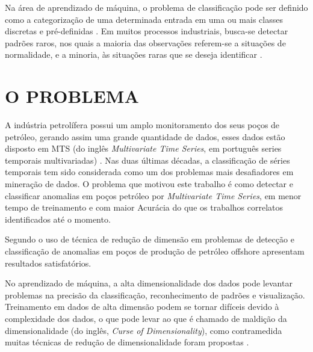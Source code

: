 Na área de aprendizado de máquina, o problema de classificação pode ser definido como a categorização de uma determinada entrada em uma ou mais classes discretas e pré-definidas \cite{kadhim2019survey}. Em muitos processos industriais, busca-se detectar padrões raros, nos quais a maioria das observações referem-se a situações de normalidade, e a minoria, às situações raras que se deseja identificar \cite{santos2016literature}.



\section{O PROBLEMA}

A indústria petrolífera possui um amplo monitoramento dos seus poços de petróleo, gerando assim uma grande quantidade de dados, esses dados estão disposto em MTS (do inglês \textit{Multivariate Time Series}, em português series temporais multivariadas) \cite{ismail2019deep}. Nas duas últimas décadas, a classificação de séries temporais tem sido considerada como um dos problemas mais desafiadores em mineração de dados.
O problema que motivou este trabalho é como detectar e classificar anomalias em poços petróleo por \textit{Multivariate Time Series}, em menor tempo de treinamento e com maior Acurácia do que os trabalhos correlatos identificados até o momento. 

Segundo \cite{rodrigo2021} o uso de técnica de redução de dimensão em problemas de detecção e classificação de anomalias em poços de produção de petróleo offshore apresentam resultados satisfatórios.

No aprendizado de máquina, a alta dimensionalidade dos dados pode levantar problemas na precisão da classificação, reconhecimento de padrões e visualização. Treinamento em dados de alta dimensão podem se tornar difíceis devido à complexidade dos dados, o que pode levar ao que é chamado de maldição da dimensionalidade (do inglês,  \textit{Curse of Dimensionality}), como contramedida  muitas técnicas de redução de dimensionalidade foram propostas \cite{nanga2021review}.

